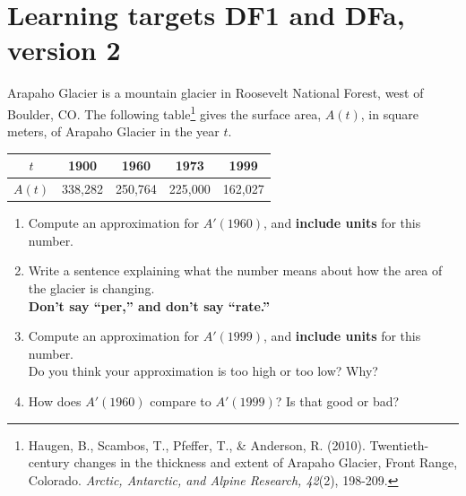 \pagebreak

\section{Learning targets DF1 and DFa, version 2}

Arapaho Glacier is a mountain glacier in Roosevelt National Forest,
west of Boulder, CO. The following table\footnote{
Haugen, B., Scambos, T., Pfeffer, T., \& Anderson, R. (2010). Twentieth-century changes in the thickness and extent of Arapaho Glacier, Front Range, Colorado. \textit{Arctic, Antarctic, and Alpine Research, 42}(2), 198-209.}
gives the surface area, $A(t)$, in square meters, of Arapaho Glacier in the year $t$. 
\begin{center}
	\begin{tabular}{|c|c|c|c|c|}
	\hline
	$t$ & 1900 & 1960 & 1973 & 1999\\
	\hline
	$A(t)$ & 338,282 & 250,764 & 225,000 & 162,027\\
	\hline
	\end{tabular}
 \end{center}
	
\begin{enumerate}[leftmargin=0pt]

\item Compute an approximation for $A'(1960)$, and {\bf include units} for this number.
\vfill
\item Write a sentence explaining what the number means about how the area of the glacier is changing.\\
\textbf{Don't say ``per,'' and don't say ``rate.''}

\vfill
\vfill

\item Compute an approximation for $A'(1999)$, and {\bf include units} for this number.\\
Do you think your approximation is too high or too low? Why?

\vfill
\vfill

\item How does $A'(1960)$ compare to $A'(1999)$? Is that good or bad?
\vfill
\end{enumerate}

\pagebreak

